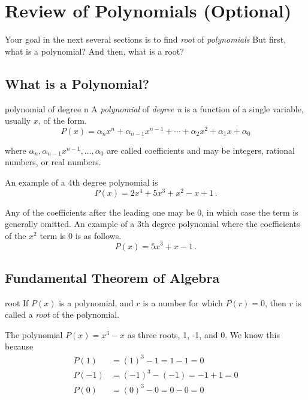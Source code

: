 \section{Review of Polynomials (Optional)}
\label{sec.general}

Your goal in the next several sections is to find \emph{root} of
\emph{polynomials} But first, what is a polynomial? And then, what is
a root?

\subsection{What is a Polynomial?}

\begin{definition}{polynomial of degree n}{}
  A \emph{polynomial} of \emph{degree n} is a function of a single
  variable, usually $x$, of the form.
  \[P(x) = \alpha_n x^n + \alpha_{n-1} x^{n-1} + \cdots + \alpha_2 x^2 + \alpha_1 x + \alpha_0 \]

  where $\alpha_n, \alpha_{n-1} x^{n-1}, \ldots, \alpha_0$ are called
  coefficients and may be integers, rational numbers, or real numbers.
\end{definition}

An example of a 4th degree polynomial is
\[P(x) = 2 x^4 + 5 x^3 + x^2 - x + 1\,.\]


Any of the coefficients after the leading one may be 0, in which case
the term is generally omitted.  An example of a 3th degree polynomial
where the coefficients of the $x^2$ term is 0 is as follows.
\[P(x) = 5 x^3 + x - 1\,.\]

\subsection{Fundamental Theorem of Algebra}

\begin{definition}{root}{}
  If $P(x)$ is a polynomial, and $r$ is a number for which $P(r)=0$,
  then $r$ is called a \emph{root} of the polynomial.
\end{definition}

The polynomial $P(x) = x^3 - x$ as three roots, 1, -1, and 0.  We know
this because
\begin{align*}
  P(1) &= (1)^3 - 1 
  = 1 - 1 
  = 0\\[3pt]
  P(-1) &= (-1)^3 - (-1) 
  = -1 + 1 
  = 0\\[3pt]
  P(0) &= (0)^3 - 0
  = 0 - 0 
  = 0  
\end{align*}

